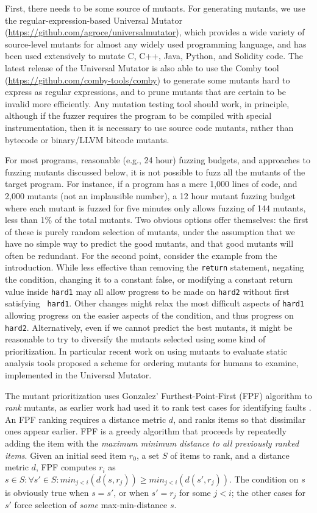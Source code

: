 First, there needs to be some source of mutants.  For generating
mutants, we use the regular-expression-based Universal Mutator
\cite{regexpMut} (\url{https://github.com/agroce/universalmutator}),
which provides a wide variety of source-level mutants for almost any
widely used programming language, and has been used extensively to
mutate C, C++, Java, Python, and Solidity code.  The latest release of
the Universal Mutator is also able to use the Comby \cite{combypaper}
tool (\url{https://github.com/comby-tools/comby}) to generate some
mutants hard to express as regular expressions, and to prune mutants
that are certain to be invalid more efficiently.  Any mutation testing
tool should work, in principle, although if the fuzzer requires the
program to be compiled with special instrumentation, then it is
necessary to use source code mutants, rather than bytecode or
binary/LLVM bitcode mutants.

For most programs, reasonable (e.g., 24 hour) fuzzing budgets, and
approaches to fuzzing mutants discussed below, it is not possible to
fuzz all the mutants of the target program.  For instance, if a
program has a mere 1,000 lines of code, and 2,000 mutants (not an
implausible number), a 12 hour mutant fuzzing budget where each mutant
is fuzzed for five minutes only allows fuzzing of 144 mutants, less
than 1\% of the total mutants.  Two obvious options offer themselves:
the first of these is
purely random selection of mutants, under the assumption that we have
no simple way to predict the good mutants, and that good mutants will
often be redundant.  For the second point, consider the example from
the introduction.  While less effective than removing the {\tt return}
statement, negating the condition, changing it to a constant false, or
modifying a constant return value inside {\tt hard1} may all allow
progress to be made on {\tt hard2} without first satisfying {\tt
  hard1}.  Other changes might relax the most difficult aspects of
{\tt hard1} allowing progress on the easier aspects of the condition,
and thus progress on {\tt hard2}.  Alternatively, even if we cannot
predict the best mutants, it might be reasonable to try to diversify
the mutants selected using some kind of prioritization.  In
particular recent work on using mutants to evaluate static
analysis tools \cite{QRS2021} proposed a scheme for ordering
mutants for humans to examine, implemented in the Universal Mutator.  

The mutant prioritization
uses Gonzalez' Furthest-Point-First \cite{Gonzalez} (FPF) algorithm
to \emph{rank} mutants, as earlier work had used it to rank test cases for identifying faults \cite{PLDI13}.
An
FPF ranking requires a distance metric $d$, and ranks items so that
dissimilar ones appear earlier.  FPF is a
greedy algorithm that proceeds by repeatedly adding the item with the
\emph{maximum minimum distance to all previously ranked items}. Given an
initial seed item $r_0$, a set $S$ of items to rank, and a distance
metric $d$, FPF computes $r_i$ as
$s \in S: \forall s' \in S: min_{ j < i}(d(s,r_j)) \geq min_{j <
  i}(d(s',r_j))$.  The condition on $s$ is obviously true when
$s = s'$, or when $s' = r_j$ for some $j < i$; the other cases for
$s'$ force selection of \emph{some}
max-min-distance $s$.


